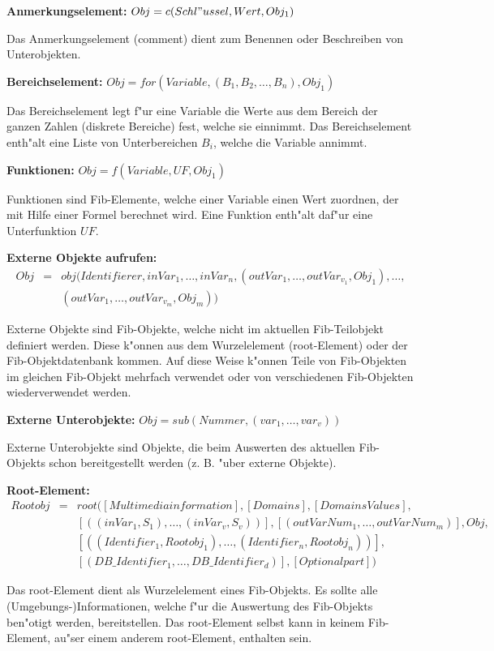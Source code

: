 \documentclass[10pt,a4paper]{article}
\begin{document}
\bigskip\noindent
\textbf{Anmerkungselement:} $Obj = c( Schl"ussel , Wert , Obj_1)$

Das Anmerkungselement (comment) dient zum Benennen oder Beschreiben von Unterobjekten.

\bigskip\noindent
\textbf{Bereichselement:} $Obj = for( Variable, ( B_{1}, B_{2},\ldots, B_{n}), Obj_1)$

Das Bereichselement legt f"ur eine Variable die Werte aus dem Bereich der ganzen Zahlen (diskrete Bereiche) fest, welche sie einnimmt. Das Bereichselement enth"alt eine Liste von Unterbereichen $B_{i}$, welche die Variable annimmt.

\bigskip\noindent
\textbf{Funktionen:} $Obj = f( Variable ,UF ,Obj_1 )$

Funktionen sind Fib-Elemente, welche einer Variable einen Wert zuordnen, der mit Hilfe einer Formel berechnet wird.
Eine Funktion enth"alt daf"ur eine Unterfunktion $UF$.

\bigskip\noindent
\textbf{Externe Objekte aufrufen:}
\begin{eqnarray*}
Obj &=& obj( Identifierer , inVar_1 , \ldots , inVar_n , ( outVar_{1}, \ldots ,outVar_{v_1}, Obj_1), \ldots , \\
  && ( outVar_{1}, \ldots ,outVar_{v_m}, Obj_m) )
\end{eqnarray*}

Externe Objekte sind Fib-Objekte, welche nicht im aktuellen Fib-Teilobjekt definiert werden. Diese k"onnen aus dem Wurzelelement (root-Element) oder der Fib-Objekt\-daten\-bank kommen. Auf diese Weise k"onnen Teile von Fib-Objekten im gleichen Fib-Objekt mehrfach verwendet oder von verschiedenen Fib-Objekten wiederverwendet werden.

\bigskip\noindent
\textbf{Externe Unterobjekte:} $Obj = sub( Nummer , (var_1, \ldots , var_v) )$

Externe Unterobjekte sind Objekte, die beim Auswerten des aktuellen Fib-Objekts schon bereitgestellt werden (z. B. "uber externe Objekte).

\bigskip\noindent
\textbf{Root-Element:}
\begin{eqnarray*}
Rootobj &=& root( [Multimediainformation], [Domains], [DomainsValues], \\
&& [((inVar_1, S_1), \ldots , (inVar_v, S_v) )], [( outVarNum_{1}, \ldots , outVarNum_m)], Obj , \\
&& [((Identifier_1, Rootobj_1) , \ldots , (Identifier_n, Rootobj_n))],\\
&& [( DB\_Identifier_1, \ldots , DB\_Identifier_d)], [Optionalpart] )
\end{eqnarray*}

Das root-Element dient als Wurzelelement eines Fib-Objekts. Es sollte alle (Um\-ge\-bungs-)Informationen, welche f"ur die Auswertung des Fib-Objekts ben"otigt werden, bereitstellen. Das root-Element selbst kann in keinem Fib-Element, au"ser einem anderem root-Element, enthalten sein.
\end{document}
